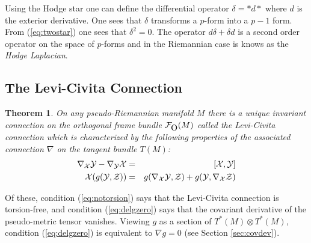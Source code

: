 \documentclass[12pt,titlepage]{article}
\def\cF{{\cal F}}
\def\cX{{\cal X}}
\def\cY{{\cal Y}}
\def\cZ{{\cal Z}}
\def\O{\hbox{O}}
\newtheorem{theorem}{Theorem}
\begin{document}
Using the Hodge star one can define the differential operator \(\delta =
* d *\)
\index{\(\delta\)}%
 where \(d\) is the exterior derivative. One sees that \(\delta\) 
transforms a
\(p\)-form into a \(p-1\) form. From (\ref{eq:twostar}) one sees
that \(\delta^2=0\). The operator \(d\delta + \delta d\)
is a second order operator on the space of \(p\)-forms and in the
Riemannian case is knows as the {\em Hodge Laplacian\/}.


\subsection{The Levi-Civita Connection}
\begin{theorem}%
On any pseudo-Riemannian manifold \(M\) there is a unique invariant
connection on the orthogonal frame bundle \(\cF_{\O}(M)\) called the
Levi-Civita connection which is  characterized by the following 
properties of the
associated connection \(\nabla\) on the tangent bundle \(T(M)\):
\begin{eqnarray}\label{eq:notorsion}%
\nabla_\cX\cY-\nabla_\cY\cX &=& [\cX,\cY]\\ \label{eq:delgzero}
\cX (g(\cY,\cZ)) &=& g(\nabla_\cX\cY,\cZ) + g(\cY,\nabla_\cX\cZ)
\end{eqnarray}%
\end{theorem}%
Of these, condition (\ref{eq:notorsion}) says that  the Levi-Civita
connection is torsion-free, and condition (\ref{eq:delgzero}) says that the
covariant derivative of the pseudo-metric tensor vanishes. 
Viewing \(g\) as a section of \(T^*(M)\otimes T^*(M)\),  condition
(\ref{eq:delgzero}) is equivalent to \(\nabla g=0\) (see Section
\ref{sec:covdev}).
\end{document}
